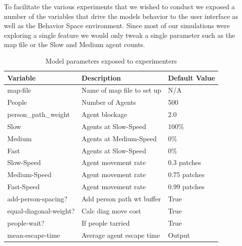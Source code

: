\documentclass[12pt,letterpaper]{article}
\begin{document}
To facilitate the various experiments that we wished to conduct we exposed a number of the variables that drive the models behavior to the user interface as well as the Behavior Space environment.  Since most of our simulations were exploring a single feature we would only tweak a single parameter such as the map file or the Slow and Medium agent counts.  
\begin{table}[H]
\begin{tabular}{| l | l | l| }
\hline
Variable & Description & Default Value \\
\hline \hline
map-file & Name of map file to set up & N/A \\
People & Number of Agents & 500 \\
person\_path\_weight & Agent blockage &  2.0 \\
Slow & Agents at Slow-Speed & 100\% \\
Medium & Agents at Medium-Speed & 0\% \\
Fast & Agents at Slow-Speed & 0\% \\
Slow-Speed & Agent movement rate & 0.3 patches \\
Medium-Speed & Agent movement rate  & 0.75 patches \\
Fast-Speed & Agent movement rate  & 0.99 patches \\
add-person-spacing? & Add person path wt buffer & True \\
equal-diagonal-weight? & Calc diag move cost & True \\
people-wait? & If people tarried & True \\
\hline
mean-escape-time & Average agent escape time & Output \\
\hline

\end{tabular}
\caption{Model parameters exposed to experimenters}
\end{table}
\end{document}
